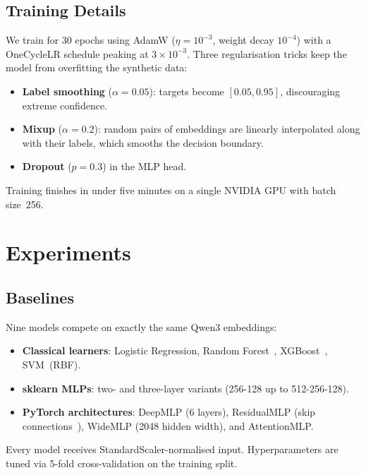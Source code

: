 \documentclass[conference]{IEEEtran}
\begin{document}
\subsection{Training Details}

We train for 30 epochs using AdamW ($\eta\!=\!10^{-3}$, weight decay $10^{-4}$) with a OneCycleLR schedule peaking at $3 \times 10^{-3}$. Three regularisation tricks keep the model from overfitting the synthetic data:
\begin{itemize}[leftmargin=*]
  \item \textbf{Label smoothing} ($\alpha\!=\!0.05$): targets become $[0.05, 0.95]$, discouraging extreme confidence.
  \item \textbf{Mixup} ($\alpha\!=\!0.2$): random pairs of embeddings are linearly interpolated along with their labels, which smooths the decision boundary.
  \item \textbf{Dropout} ($p\!=\!0.3$) in the MLP head.
\end{itemize}
Training finishes in under five minutes on a single NVIDIA GPU with batch size~256.

\section{Experiments}
\label{sec:exp}

\subsection{Baselines}

Nine models compete on exactly the same Qwen3 embeddings:

\begin{itemize}[leftmargin=*]
  \item \textbf{Classical learners}: Logistic Regression, Random Forest~\cite{breiman2001random_forest}, XGBoost~\cite{chen2016xgboost}, SVM~(RBF).
  \item \textbf{sklearn MLPs}: two- and three-layer variants (256-128 up to 512-256-128).
  \item \textbf{PyTorch architectures}: DeepMLP (6 layers), ResidualMLP (skip connections~\cite{he2016resnet}), WideMLP (2048 hidden width), and AttentionMLP.
\end{itemize}

Every model receives StandardScaler-normalised input. Hyperparameters are tuned via 5-fold cross-validation on the training split.
\end{document}
